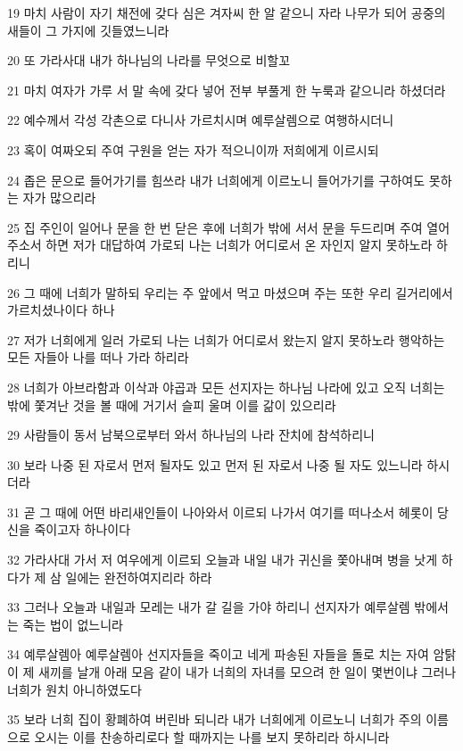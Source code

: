 \par 19 마치 사람이 자기 채전에 갖다 심은 겨자씨 한 알 같으니 자라 나무가 되어 공중의 새들이 그 가지에 깃들였느니라
\par 20 또 가라사대 내가 하나님의 나라를 무엇으로 비할꼬
\par 21 마치 여자가 가루 서 말 속에 갖다 넣어 전부 부풀게 한 누룩과 같으니라 하셨더라
\par 22 예수께서 각성 각촌으로 다니사 가르치시며 예루살렘으로 여행하시더니
\par 23 혹이 여짜오되 주여 구원을 얻는 자가 적으니이까 저희에게 이르시되
\par 24 좁은 문으로 들어가기를 힘쓰라 내가 너희에게 이르노니 들어가기를 구하여도 못하는 자가 많으리라
\par 25 집 주인이 일어나 문을 한 번 닫은 후에 너희가 밖에 서서 문을 두드리며 주여 열어 주소서 하면 저가 대답하여 가로되 나는 너희가 어디로서 온 자인지 알지 못하노라 하리니
\par 26 그 때에 너희가 말하되 우리는 주 앞에서 먹고 마셨으며 주는 또한 우리 길거리에서 가르치셨나이다 하나
\par 27 저가 너희에게 일러 가로되 나는 너희가 어디로서 왔는지 알지 못하노라 행악하는 모든 자들아 나를 떠나 가라 하리라
\par 28 너희가 아브라함과 이삭과 야곱과 모든 선지자는 하나님 나라에 있고 오직 너희는 밖에 쫓겨난 것을 볼 때에 거기서 슬피 울며 이를 갊이 있으리라
\par 29 사람들이 동서 남북으로부터 와서 하나님의 나라 잔치에 참석하리니
\par 30 보라 나중 된 자로서 먼저 될자도 있고 먼저 된 자로서 나중 될 자도 있느니라 하시더라
\par 31 곧 그 때에 어떤 바리새인들이 나아와서 이르되 나가서 여기를 떠나소서 헤롯이 당신을 죽이고자 하나이다
\par 32 가라사대 가서 저 여우에게 이르되 오늘과 내일 내가 귀신을 쫓아내며 병을 낫게 하다가 제 삼 일에는 완전하여지리라 하라
\par 33 그러나 오늘과 내일과 모레는 내가 갈 길을 가야 하리니 선지자가 예루살렘 밖에서는 죽는 법이 없느니라
\par 34 예루살렘아 예루살렘아 선지자들을 죽이고 네게 파송된 자들을 돌로 치는 자여 암탉이 제 새끼를 날개 아래 모음 같이 내가 너희의 자녀를 모으려 한 일이 몇번이냐 그러나 너희가 원치 아니하였도다
\par 35 보라 너희 집이 황폐하여 버린바 되니라 내가 너희에게 이르노니 너희가 주의 이름으로 오시는 이를 찬송하리로다 할 때까지는 나를 보지 못하리라 하시니라


